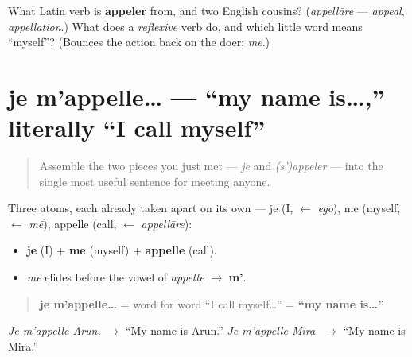 \begin{tcolorbox}[breakable,colback=teal!4,colframe=teal!35!black,title={Before you move on}]
What Latin verb is \textbf{appeler} from, and two English cousins? (\emph{appellāre} — \emph{appeal}, \emph{appellation}.) What does a \emph{reflexive} verb do, and which little word means \textquotedblleft{}myself\textquotedblright{}? (Bounces the action back on the doer; \emph{me}.)
\end{tcolorbox}
\section[je m'appelle…]{je m'appelle… — \textquotedblleft{}my name is…,\textquotedblright{} literally \textquotedblleft{}I call myself\textquotedblright{}}

\label{lesson:FR-C02-je-mappelle}



\begin{quote}
Assemble the two pieces you just met — \emph{je} and \emph{(s')appeler} — into the single most useful sentence for meeting anyone.
\end{quote}

\begin{cousinweb}
Three atoms, each already taken apart on its own — je (I, $\leftarrow$ \emph{ego}), me (myself, $\leftarrow$ \emph{mē}), appelle (call, $\leftarrow$ \emph{appellāre}):

\begin{itemize}
\raggedright
  \item \textbf{je} (I) + \textbf{me} (myself) + \textbf{appelle} (call).
  \item \emph{me} elides before the vowel of \emph{appelle} $\to$ \textbf{m'}.
\end{itemize}

\begin{quote}
\textbf{je m'appelle…} = word for word \textquotedblleft{}I call myself…\textquotedblright{} = \textbf{\textquotedblleft{}my name is…\textquotedblright{}}
\end{quote}

\emph{Je m'appelle Arun.} $\to$ \textquotedblleft{}My name is Arun.\textquotedblright{} \emph{Je m'appelle Mira.} $\to$ \textquotedblleft{}My name is Mira.\textquotedblright{}
\end{cousinweb}

